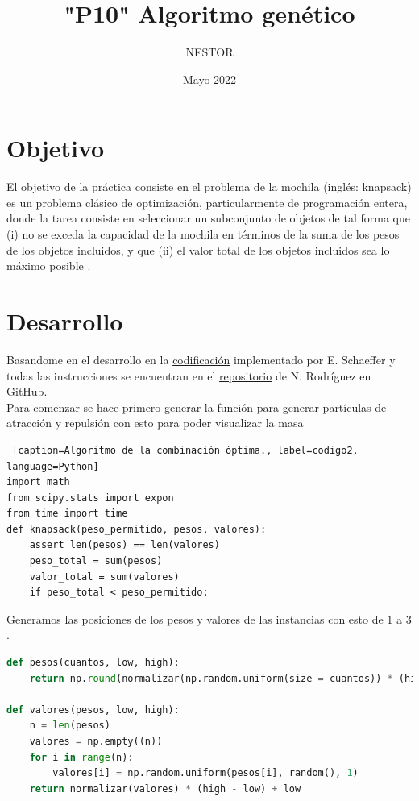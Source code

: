 \documentclass{article}
\title{"P10" Algoritmo genético}
\author{NESTOR}
\date {Mayo 2022}
\begin{document}
\maketitle

\section{Objetivo}\label{obj}
El objetivo de la práctica consiste en el problema de la mochila (inglés: knapsack) es un problema clásico de optimización, particularmente de programación entera, donde la tarea consiste en seleccionar un subconjunto de objetos de tal forma que (i) no se exceda la capacidad de la mochila en términos de la suma de los pesos de los objetos incluidos, y que (ii) el valor total de los objetos incluidos sea lo máximo posible \cite{elisa1}.

\section{Desarrollo}\label{des}
Basandome en el desarrollo en la \href{https://github.com/satuelisa/Simulation/blob/master/Particles/creation.py}{codificación} implementado por E. Schaeffer y todas las instrucciones se encuentran en el  \href{https://github.com/NestorZeus/SIMULACION-COMPUTACIONAL-DE-NANOMATERIALES/tree/main/P9}{repositorio} de N. Rodríguez en GitHub.\\

Para comenzar se hace primero generar la función para generar partículas de atracción y repulsión con esto para poder visualizar la masa

\begin{lstlisting} [caption=Algoritmo de la combinación óptima., label=codigo2, language=Python]
import math
from scipy.stats import expon
from time import time
def knapsack(peso_permitido, pesos, valores):
    assert len(pesos) == len(valores)
    peso_total = sum(pesos)
    valor_total = sum(valores)
    if peso_total < peso_permitido: 
\end{lstlisting}

Generamos las posiciones de los pesos y valores de las instancias con esto de $1$ a $3$.

\begin{lstlisting}[caption=Pesos y Valores, label=codigo2, language=Python]
def pesos(cuantos, low, high):
    return np.round(normalizar(np.random.uniform(size = cuantos)) * (high - low) + low)
 
def valores(pesos, low, high):
    n = len(pesos)
    valores = np.empty((n))
    for i in range(n):
        valores[i] = np.random.uniform(pesos[i], random(), 1)
    return normalizar(valores) * (high - low) + low
\end{lstlisting}
\end{document}
